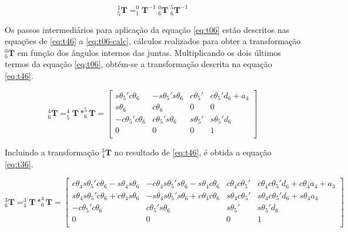 \begin{equation}
    \label{eq:t15}
    ^1_5\textbf{T} = ^0_1\!\textbf{T}^{-1}\;^0_6\textbf{T}\;^5_6\textbf{T}^{-1}
\end{equation}

Os passos intermediários para aplicação da equação \ref{eq:t06} estão descritos nas equações de \ref{eq:t46} a
\ref{eq:t06-calc}, cálculos realizados para obter a transformação $^0_6\textbf{T}$ em função dos ângulos internos das juntas.
Multiplicando os dois últimos termos da equação \ref{eq:t06}, obtém-se a transformação descrita na
equação \ref{eq:t46}.

\begin{equation}
    \label{eq:t46}
    ^4_6\textbf{T} = ^4_5\textbf{T}*^5_6\textbf{T} =   \begin{bmatrix}
                                s\theta_5'c\theta_6 & -s\theta_5's\theta_6 & c\theta_5' & c\theta_5'd_6 + a_4 \\
                                s\theta_6 & c\theta_6 & 0 & 0 \\
                                -c\theta_5'c\theta_6 & c\theta_5's\theta_6 & s\theta_5' & s\theta_5'd_6 \\
                                0 & 0 & 0 & 1 \\
                            \end{bmatrix}
\end{equation}

Incluindo a transformação $^3_4\textbf{T}$ no resultado de \ref{eq:t46}, é obtida a equação \ref{eq:t36}.

\begin{equation}
    \label{eq:t36}
    ^3_6\textbf{T} = ^3_4\textbf{T}*^4_6\textbf{T} =   \begin{bmatrix}
                                c\theta_4s\theta_5'c\theta_6 - s\theta_4s\theta_6 & -c\theta_4s\theta_5's\theta_6 - s\theta_4c\theta_6 & c\theta_4c\theta_5' & c\theta_4c\theta_5'd_6 + c\theta_4a_4 + a_3 \\
                                s\theta_4s\theta_5'c\theta_6 + c\theta_4s\theta_6 & -s\theta_4s\theta_5's\theta_6 + c\theta_4c\theta_6 & s\theta_4c\theta_5' & s\theta_4c\theta_5'd_6 + s\theta_4a_4 \\
                                -c\theta_5'c\theta_6 & c\theta_5's\theta_6 & s\theta_5' & s\theta_5'd_6 \\
                                0 & 0 & 0 & 1 \\
                            \end{bmatrix}
\end{equation}

